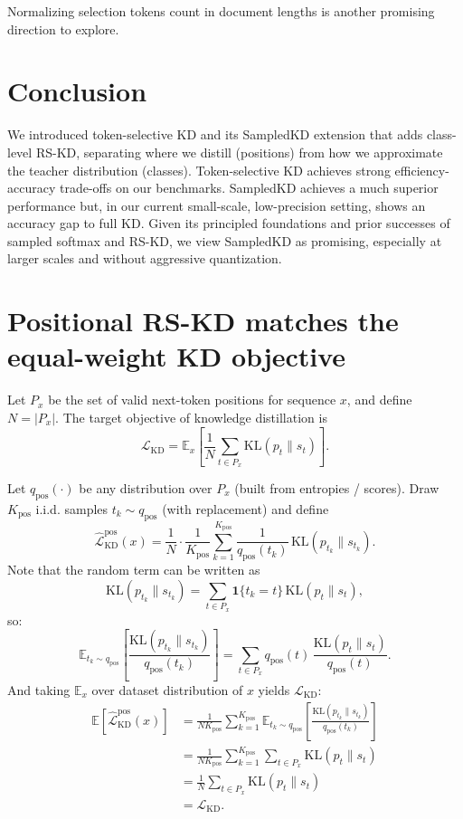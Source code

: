 \documentclass[11pt]{article}
\begin{document}
Normalizing selection tokens count in document lengths is another promising direction to explore.

\section{Conclusion}
\label{sec:conclusion}
We introduced token-selective KD and its SampledKD extension that adds class-level RS-KD, separating where we distill (positions) from how we approximate the teacher distribution (classes).
Token-selective KD achieves strong efficiency-accuracy trade-offs on our benchmarks.
SampledKD achieves a much superior performance but, in our current small-scale, low-precision setting, shows an accuracy gap to full KD.
Given its principled foundations and prior successes of sampled softmax and RS-KD, we view SampledKD as promising, especially at larger scales and without aggressive quantization.





\appendix
\section{Positional RS-KD matches the equal-weight KD objective}
\label{app:pos-rs-kd-proof}

Let \(P_x\) be the set of valid next-token positions for sequence \(x\), and define \(N=\lvert P_x\rvert\).
The target objective of knowledge distillation is
\[
	\mathcal{L}_{\text{KD}}
	=\mathbb{E}_{x}\!\left[\frac{1}{N}\sum_{t\in P_x}\mathrm{KL}(p_t\|s_t)\right].
\]

Let \(q_{\text{pos}}(\cdot)\) be any distribution over \(P_x\) (built from entropies / scores).
Draw \(K_{\text{pos}}\) i.i.d. samples \(t_k\sim q_{\text{pos}}\) (with replacement) and define
\[
	\widehat{\mathcal{L}}_{\text{KD}}^{\text{pos}}(x)
	=\frac{1}{N}\cdot\frac{1}{K_{\text{pos}}}\sum_{k=1}^{K_{\text{pos}}}
	\frac{1}{q_{\text{pos}}(t_k)}\,\mathrm{KL}(p_{t_k}\|s_{t_k}).
\]
Note that the random term can be written as
\[
\mathrm{KL}(p_{t_k}\|s_{t_k})
=\sum_{t\in P_x}\mathbf{1}\!\{t_k=t\}\,\mathrm{KL}(p_t\|s_t),
\]
so:
\[
\mathbb{E}_{t_k\sim q_{\text{pos}}}\!\left[
  \frac{\mathrm{KL}(p_{t_k}\|s_{t_k})}{q_{\text{pos}}(t_k)}
\right]
= \sum_{t\in P_x} q_{\text{pos}}(t)\,
  \frac{\mathrm{KL}(p_t\|s_t)}{q_{\text{pos}}(t)}.
\]
And taking \(\mathbb{E}_x\) over dataset distribution of \(x\) yields \(\mathcal{L}_{\text{KD}}\):
\begin{align*}
\mathbb{E}\!\left[\widehat{\mathcal{L}}_{\text{KD}}^{\text{pos}}(x)\right]
&= \frac{1}{N K_{\text{pos}}}\sum_{k=1}^{K_{\text{pos}}}
   \mathbb{E}_{t_k\sim q_{\text{pos}}}\!\left[
     \frac{\mathrm{KL}(p_{t_k}\|s_{t_k})}{q_{\text{pos}}(t_k)}
   \right] \\
&= \frac{1}{N K_{\text{pos}}}\sum_{k=1}^{K_{\text{pos}}}
   \sum_{t\in P_x}\mathrm{KL}(p_t\|s_t) \\
&= \frac{1}{N}\sum_{t\in P_x}\mathrm{KL}(p_t\|s_t) \\
&=\mathcal{L}_{\text{KD}}.
\end{align*}
\end{document}
